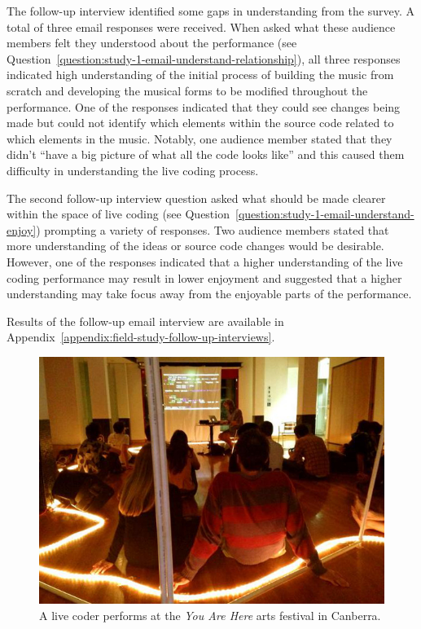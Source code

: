 The follow-up interview identified some gaps in understanding from the survey. A total of three email responses were received. When asked what these audience members felt they understood about the performance (see Question~\ref{question:study-1-email-understand-relationship}), all three responses indicated high understanding of the initial process of building the music from scratch and developing the musical forms to be modified throughout the performance. One of the responses indicated that they could see changes being made but could not identify which elements within the source code related to which elements in the music. Notably, one audience member stated that they didn't ``have a big picture of what all the code looks like'' and this caused them difficulty in understanding the live coding process. 

The second follow-up interview question asked what should be made clearer within the space of live coding (see Question~\ref{question:study-1-email-understand-enjoy}) prompting a variety of responses. Two audience members stated that more understanding of the ideas or source code changes would be desirable. However, one of the responses indicated that a higher understanding of the live coding performance may result in lower enjoyment and suggested that a higher understanding may take focus away from the enjoyable parts of the performance. 


Results of the follow-up email interview are available in Appendix~\ref{appendix:field-study-follow-up-interviews}.

\begin{figure}
\centering
\includegraphics[width=\textwidth]{../images/study-1-you-are-here.jpg}
\caption[\textit{You Are Here} live coding performance]{A live coder performs at the \textit{You Are Here} arts festival in Canberra.}
\label{fig:you-are-here-performance}
\end{figure}

